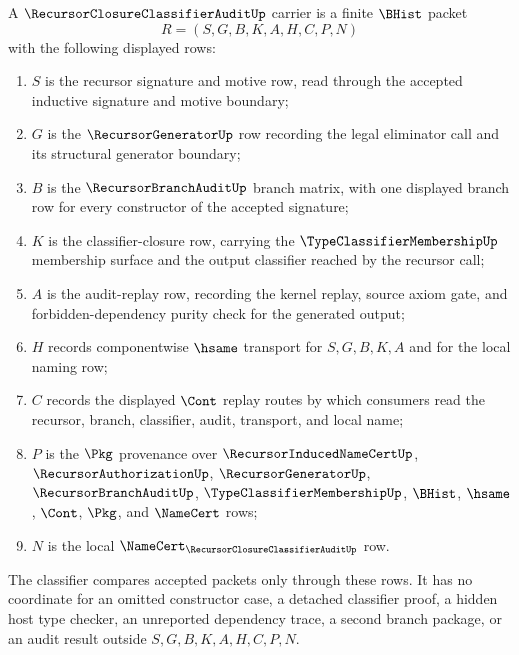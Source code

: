 \begin{definition}
\label{def:recursor-closure-classifier-audit-carrier}
A $\RecursorClosureClassifierAuditUp$ carrier is a finite $\BHist$ packet
$$
R=(S,G,B,K,A,H,C,P,N)
$$
with the following displayed rows:
\begin{enumerate}
\item $S$ is the recursor signature and motive row, read through the accepted inductive signature and motive boundary;
\item $G$ is the $\RecursorGeneratorUp$ row recording the legal eliminator call and its structural generator boundary;
\item $B$ is the $\RecursorBranchAuditUp$ branch matrix, with one displayed branch row for every constructor of the accepted signature;
\item $K$ is the classifier-closure row, carrying the $\TypeClassifierMembershipUp$ membership surface and the output classifier reached by the recursor call;
\item $A$ is the audit-replay row, recording the kernel replay, source axiom gate, and forbidden-dependency purity check for the generated output;
\item $H$ records componentwise $\hsame$ transport for $S,G,B,K,A$ and for the local naming row;
\item $C$ records the displayed $\Cont$ replay routes by which consumers read the recursor, branch, classifier, audit, transport, and local name;
\item $P$ is the $\Pkg$ provenance over $\RecursorInducedNameCertUp$, $\RecursorAuthorizationUp$, $\RecursorGeneratorUp$, $\RecursorBranchAuditUp$, $\TypeClassifierMembershipUp$, $\BHist$, $\hsame$, $\Cont$, $\Pkg$, and $\NameCert$ rows;
\item $N$ is the local $\NameCert_{\RecursorClosureClassifierAuditUp}$ row.
\end{enumerate}
The classifier compares accepted packets only through these rows. It has no coordinate for an omitted constructor case, a detached classifier proof, a hidden host type checker, an unreported dependency trace, a second branch package, or an audit result outside $S,G,B,K,A,H,C,P,N$.
\end{definition}

